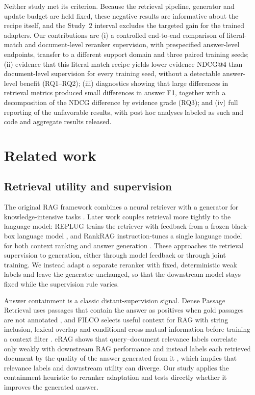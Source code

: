 Neither study met its criterion. Because the retrieval pipeline, generator and update budget are held fixed, these negative results are informative about the recipe itself, and the Study~2 interval excludes the targeted gain for the trained adapters. Our contributions are (i) a controlled end-to-end comparison of literal-match and document-level reranker supervision, with prespecified answer-level endpoints, transfer to a different support domain and three paired training seeds; (ii) evidence that this literal-match recipe yields lower evidence NDCG@4 than document-level supervision for every training seed, without a detectable answer-level benefit (RQ1--RQ2); (iii) diagnostics showing that large differences in retrieval metrics produced small differences in answer F1, together with a decomposition of the NDCG difference by evidence grade (RQ3); and (iv) full reporting of the unfavorable results, with post hoc analyses labeled as such and code and aggregate results released.

\section{Related work}
\subsection{Retrieval utility and supervision}
The original RAG framework combines a neural retriever with a generator for knowledge-intensive tasks \citep{lewis2020}. Later work couples retrieval more tightly to the language model: REPLUG trains the retriever with feedback from a frozen black-box language model \citep{shi2024}, and RankRAG instruction-tunes a single language model for both context ranking and answer generation \citep{yu2024}. These approaches tie retrieval supervision to generation, either through model feedback or through joint training. We instead adapt a separate reranker with fixed, deterministic weak labels and leave the generator unchanged, so that the downstream model stays fixed while the supervision rule varies.

Answer containment is a classic distant-supervision signal. Dense Passage Retrieval uses passages that contain the answer as positives when gold passages are not annotated \citep{karpukhin2020}, and FILCO selects useful context for RAG with string inclusion, lexical overlap and conditional cross-mutual information before training a context filter \citep{wang2023filco}. eRAG shows that query--document relevance labels correlate only weakly with downstream RAG performance and instead labels each retrieved document by the quality of the answer generated from it \citep{salemi2024}, which implies that relevance labels and downstream utility can diverge. Our study applies the containment heuristic to reranker adaptation and tests directly whether it improves the generated answer.

